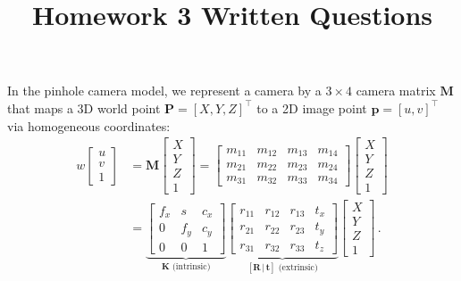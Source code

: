 \documentclass{csci1430}
\begin{document}
\title{Homework 3 Written Questions}
\maketitle

\writeinstructions


\pagebreak

\begin{question}[points=8,drawbox=false]
In the pinhole camera model, we represent a camera by a $3\times4$ camera matrix $\mathbf{M}$ that maps a 3D world point $\mathbf{P} = [X, Y, Z]^\top$ to a 2D image point $\mathbf{p} = [u, v]^\top$ via homogeneous coordinates:
%
\begin{equation}
\begin{aligned}
w \begin{bmatrix} u \\ v \\ 1 \end{bmatrix}
&= \mathbf{M} \begin{bmatrix} X \\ Y \\ Z \\ 1 \end{bmatrix}
= \begin{bmatrix} m_{11} & m_{12} & m_{13} & m_{14} \\ m_{21} & m_{22} & m_{23} & m_{24} \\ m_{31} & m_{32} & m_{33} & m_{34} \end{bmatrix}
\begin{bmatrix} X \\ Y \\ Z \\ 1 \end{bmatrix} \\
&= \underbrace{\begin{bmatrix} f_x & s & c_x \\ 0 & f_y & c_y \\ 0 & 0 & 1 \end{bmatrix}}_{\mathbf{K}\text{ (intrinsic)}}
\underbrace{\begin{bmatrix} r_{11} & r_{12} & r_{13} & t_x \\ r_{21} & r_{22} & r_{23} & t_y \\ r_{31} & r_{32} & r_{33} & t_z \end{bmatrix}}_{[\mathbf{R}\,|\,\mathbf{t}]\text{ (extrinsic)}}
\begin{bmatrix} X \\ Y \\ Z \\ 1 \end{bmatrix} \, .

\end{aligned}
\end{equation}
\end{question}
\end{document}

